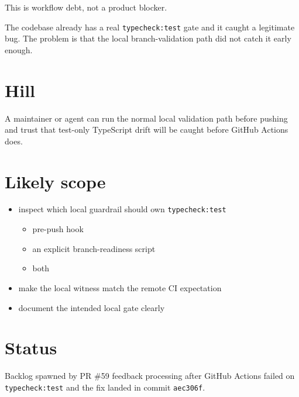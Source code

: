 This is workflow debt, not a product blocker.

The codebase already has a real \texttt{t\allowbreak{}y\allowbreak{}p\allowbreak{}e\allowbreak{}c\allowbreak{}h\allowbreak{}e\allowbreak{}c\allowbreak{}k\allowbreak{}:\allowbreak{}t\allowbreak{}e\allowbreak{}s\allowbreak{}t} gate and it caught a legitimate bug. The problem is that the local branch-validation path did not catch it early enough.

\section{Hill}\label{record-409-hill}

A maintainer or agent can run the normal local validation path before pushing and trust that test-only TypeScript drift will be caught before GitHub Actions does.

\section{Likely scope}\label{record-409-likely-scope}

\begin{itemize}
\tightlist
\item
  inspect which local guardrail should own \texttt{t\allowbreak{}y\allowbreak{}p\allowbreak{}e\allowbreak{}c\allowbreak{}h\allowbreak{}e\allowbreak{}c\allowbreak{}k\allowbreak{}:\allowbreak{}t\allowbreak{}e\allowbreak{}s\allowbreak{}t}

  \begin{itemize}
  \tightlist
  \item
    pre-push hook
  \item
    an explicit branch-readiness script
  \item
    both
  \end{itemize}
\item
  make the local witness match the remote CI expectation
\item
  document the intended local gate clearly
\end{itemize}

\section{Status}\label{record-409-status}

Backlog spawned by PR \#59 feedback processing after GitHub Actions failed on \texttt{t\allowbreak{}y\allowbreak{}p\allowbreak{}e\allowbreak{}c\allowbreak{}h\allowbreak{}e\allowbreak{}c\allowbreak{}k\allowbreak{}:\allowbreak{}t\allowbreak{}e\allowbreak{}s\allowbreak{}t} and the fix landed in commit \texttt{a\allowbreak{}e\allowbreak{}c\allowbreak{}3\allowbreak{}0\allowbreak{}6\allowbreak{}f}.

